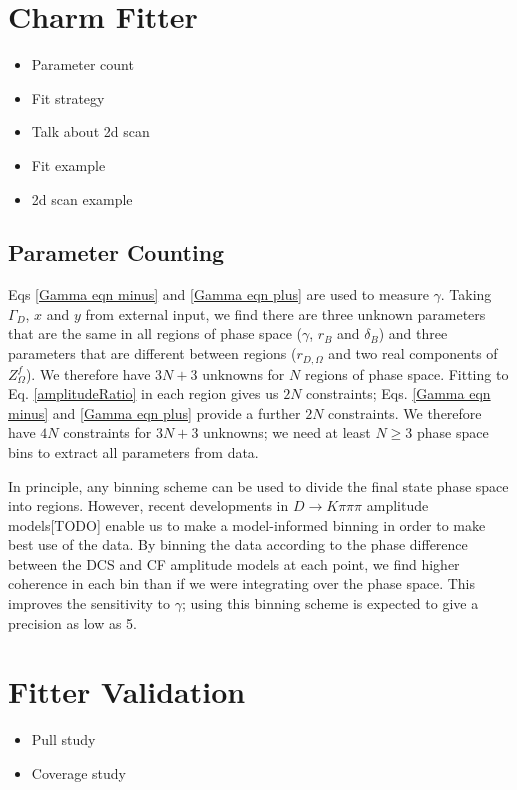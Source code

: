 \documentclass[note.tex]{subfiles}
\begin{document}
\section{Charm Fitter}
\begin{itemize}
    \item Parameter count
    \item Fit strategy
    \item Talk about 2d scan
    \item Fit example
    \item 2d scan example
\end{itemize}
\subsection{Parameter Counting}
Eqs \ref{Gamma eqn minus} and \ref{Gamma eqn plus} are used to measure $\gamma$.
Taking $\Gamma_D$, $x$ and $y$ from external input, we find there are three unknown parameters that are the same in all regions of phase space ($\gamma$, $r_B$ and $\delta_B$) and three parameters that are different between regions ($r_{D, \Omega}$ and two real components of $Z_\Omega^f$).
We therefore have $3N + 3$ unknowns for $N$ regions of phase space.
Fitting to Eq. \ref{amplitudeRatio} in each region gives us $2N$ constraints; Eqs. \ref{Gamma eqn minus} and \ref{Gamma eqn plus} provide a further $2N$ constraints.
We therefore have $4N$ constraints for $3N + 3$ unknowns; we need at least $N\geq 3$ phase space bins to extract all parameters from data.

In principle, any binning scheme can be used to divide the final state phase space into regions.
However, recent developments in $D\rightarrow K \pi \pi \pi$ amplitude models[TODO] enable us to make a model-informed binning in order to make best use of the data.
By binning the data according to the phase difference between the DCS and CF amplitude models at each point,
we find higher coherence in each bin than if we were integrating over the phase space.
This improves the sensitivity to $\gamma$; using this binning scheme is expected to give a precision as low as 5\degree[TODO].


\section{Fitter Validation}
\begin{itemize}
    \item Pull study
    \item Coverage study
\end{itemize}
\end{document}
